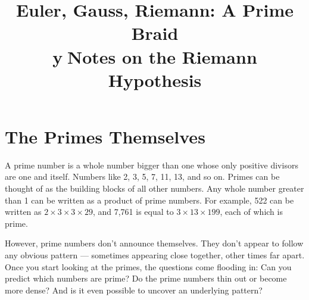 \documentclass[11pt]{article}
\title{\color{headingblue}\huge\bfseries Euler, Gauss, Riemann: A Prime Braid\\[0.3em]
\color{subblue}\Large {\small\textcircled{y}}Notes on the Riemann Hypothesis}
\date{}
\begin{document}
\maketitle

\vspace*{-10mm}

%
%
%
%
\section{The Primes Themselves}

A prime number is a whole number bigger than one whose only positive divisors are one and itself. Numbers like 2, 3, 5, 7, 11, 13, and so on. Primes can be thought of as the building blocks of all other numbers. Any whole number greater than 1 can be written as a product of prime numbers. For example, 522 can be written as $2 \times 3 \times 3 \times 29$, and 7,761 is equal to $3 \times 13 \times 199$, each of which is prime.

However, prime numbers don't announce themselves. They don't appear to follow any obvious pattern --- sometimes appearing close together, other times far apart. Once you start looking at the primes, the questions come flooding in: Can you predict which numbers are prime? Do the prime numbers thin out or become more dense? And is it even possible to uncover an underlying pattern?
\end{document}
